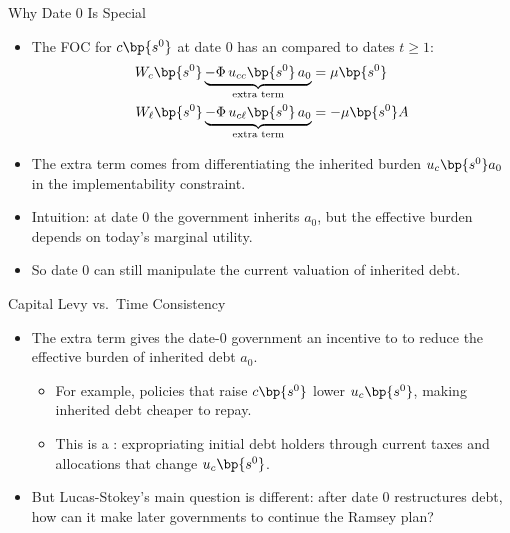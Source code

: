 \documentclass[11pt,xcolor={dvipsnames},aspectratio=159,hyperref={pdftex,pdfpagemode=UseNone,hidelinks,pdfdisplaydoctitle=true},usepdftitle=false]{beamer}
\begin{document}
            \begin{frame}
            \end{frame}

            \begin{frame}{Why Date 0 Is Special}
                \begin{itemize}
                \item The FOC for $c\bp{s^0}$ at date 0 has an  compared to dates $t \geq 1$:
                \footnotesize
                 \begin{align*}
                    W_c\bp{s^0} \underbrace{- \Phi\, u_{cc}\bp{s^0}\, a_0}_{\text{extra term}}  & =  \mu \bp{s^0} \\
                    W_\ell\bp{s^0} \underbrace{- \Phi\, u_{c\ell}\bp{s^0}\, a_0}_{\text{extra term}}  & =  - \mu \bp{s^0} A
                  \end{align*}
                  \normalsize
                \item The extra term comes from differentiating the inherited burden $u_c\bp{s^0} a_0$ in the implementability constraint.
                \item Intuition: at date 0 the government inherits  $a_0$, but the effective burden depends on today's marginal utility.
                \item So date 0 can still manipulate the current valuation of inherited debt.
                \end{itemize}
            \end{frame}

            \begin{frame}{Capital Levy vs.\ Time Consistency}
                \begin{itemize}
                \item The extra term gives the date-0 government an incentive to  to reduce the effective burden of inherited debt $a_0$.
                \begin{itemize}
                    \item For example, policies that raise $c\bp{s^0}$ lower $u_c\bp{s^0}$, making inherited debt cheaper to repay.
                    \item This is a : expropriating initial debt holders through current taxes and allocations that change $u_c\bp{s^0}$.
                \end{itemize}
                \item But Lucas-Stokey's main question is different:
                after date 0 restructures debt, how can it make later governments  to continue the Ramsey plan?
                \end{itemize}
            \end{frame}
\end{document}
